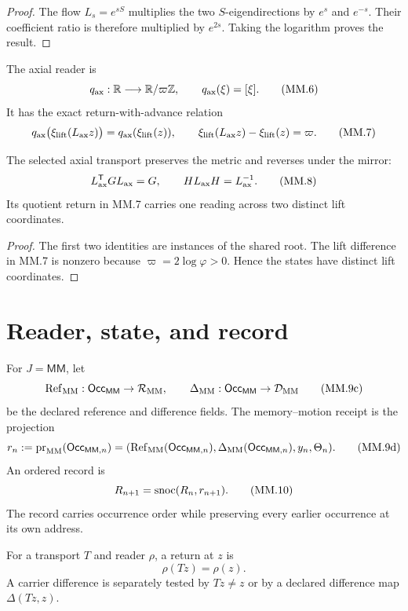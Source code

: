 \documentclass[10pt]{article}
\begin{document}
\begin{proof}
The flow $L_s=e^{sS}$ multiplies the two $S$-eigendirections by $e^s$ and
$e^{-s}$. Their coefficient ratio is therefore multiplied by $e^{2s}$.
Taking the logarithm proves the result.
\end{proof}

The axial reader is
\[
q_{\rm ax}:\mathbb R\longrightarrow\mathbb R/\varpi\mathbb Z,
\qquad q_{\rm ax}(\xi)=[\xi].
\tag{MM.6}
\]
It has the exact return-with-advance relation
\[
q_{\rm ax}\bigl(\xi_{\rm lift}(L_{\rm ax}z)\bigr)
=q_{\rm ax}(\xi_{\rm lift}(z)),
\qquad
\xi_{\rm lift}(L_{\rm ax}z)-\xi_{\rm lift}(z)=\varpi.
\tag{MM.7}
\]

\begin{theorem}
The selected axial transport preserves the metric and reverses under the
mirror:
\[
L_{\rm ax}^{\mathsf T}GL_{\rm ax}=G,\qquad
HL_{\rm ax}H=L_{\rm ax}^{-1}.
\tag{MM.8}
\]
Its quotient return in MM.7 carries one reading across two distinct lift
coordinates.
\end{theorem}

\begin{proof}
The first two identities are instances of the shared root. The lift
difference in MM.7 is nonzero because $\varpi=2\log\varphi>0$. Hence the
states have distinct lift coordinates.
\end{proof}

\section{Reader, state, and record}


For $J=\mathsf{MM}$, let
\[
\operatorname{Ref}_{\rm MM}:\mathsf{Occ}_{\mathsf{MM}}
\to\mathcal R_{\rm MM},
\qquad
\Delta_{\rm MM}:\mathsf{Occ}_{\mathsf{MM}}
\to\mathcal D_{\rm MM}
\tag{MM.9c}
\]
be the declared reference and difference fields. The memory--motion receipt is
the projection
\[
r_n:=\operatorname{pr}_{\rm MM}(\mathsf{Occ}_{\mathsf{MM},n})
=(\operatorname{Ref}_{\rm MM}(\mathsf{Occ}_{\mathsf{MM},n}),
\Delta_{\rm MM}(\mathsf{Occ}_{\mathsf{MM},n}),y_n,\Theta_n).
\tag{MM.9d}
\]
An ordered record is
\[
R_{n+1}=\operatorname{snoc}(R_n,r_{n+1}).
\tag{MM.10}
\]
The record carries occurrence order while preserving every earlier occurrence
at its own address.

\begin{definition}
For a transport $T$ and reader $\rho$, a return at $z$ is
\[
\rho(Tz)=\rho(z).
\tag{MM.11}
\]
A carrier difference is separately tested by $Tz\ne z$ or by a declared
difference map $\Delta(Tz,z)$.
\end{definition}
\end{document}
